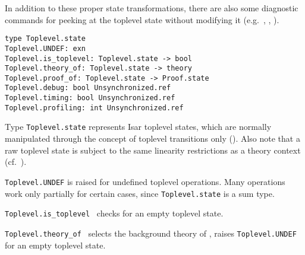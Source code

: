 \begin{isabellebody}
\begin{isamarkuptext}
  In addition to these proper state transformations, there are also
  some diagnostic commands for peeking at the toplevel state without
  modifying it (e.g.\ , ,
  ).%
\end{isamarkuptext}%
\isamarkuptrue%
%
\isadelimmlref
%
\endisadelimmlref
%
\isatagmlref
%
\begin{isamarkuptext}%
\begin{mldecls}
  \verb|type Toplevel.state| \\
  \verb|Toplevel.UNDEF: exn| \\
  \verb|Toplevel.is_toplevel: Toplevel.state -> bool| \\
  \verb|Toplevel.theory_of: Toplevel.state -> theory| \\
  \verb|Toplevel.proof_of: Toplevel.state -> Proof.state| \\
  \verb|Toplevel.debug: bool Unsynchronized.ref| \\
  \verb|Toplevel.timing: bool Unsynchronized.ref| \\
  \verb|Toplevel.profiling: int Unsynchronized.ref| \\
  \end{mldecls}

  \begin{description}

  \item Type \verb|Toplevel.state| represents Isar toplevel
  states, which are normally manipulated through the concept of
  toplevel transitions only ().  Also
  note that a raw toplevel state is subject to the same linearity
  restrictions as a theory context (cf.~).

  \item \verb|Toplevel.UNDEF| is raised for undefined toplevel
  operations.  Many operations work only partially for certain cases,
  since \verb|Toplevel.state| is a sum type.

  \item \verb|Toplevel.is_toplevel|~ checks for an empty
  toplevel state.

  \item \verb|Toplevel.theory_of|~ selects the
  background theory of , raises \verb|Toplevel.UNDEF|
  for an empty toplevel state.


\end{description}
\end{isamarkuptext}
\end{isabellebody}
